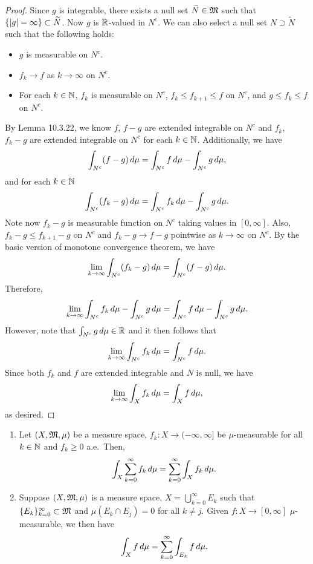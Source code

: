 \documentclass[a4paper]{article}
\renewcommand{\cupinfk}{\bigcup_{k=0}^\infty}
\renewcommand{\suminfk}{\sum_{k=0}^\infty}
\renewcommand{\seqinfk}[1]{\{ #1 \}_{k=0}^\infty}
\begin{document}
\begin{proof}
  Since $g$ is integrable, there exists a null set $\widetilde{N} \in \mathfrak{M}$
  such that $\left\{ \left\lvert g\right\rvert = \infty \right\} \subset \widetilde{N}$. Now $g$
  is $\mathbb{R}$-valued in $N^c$. We can also select a null set $N \supset
    \tilde{N}$ such that the following holds:
  \begin{itemize}
    \item $g$ is measurable on $N^c$.
    \item $f_k \to f$ as $k \to \infty$ on $N^c$.
    \item For each $k \in \mathbb{N}$, $f_k$ is measurable on $N^c$, $f_k \leq
          f_{k+1} \leq f$ on $N^c$, and $g \leq f_k \leq f$ on $N^c$.
  \end{itemize}
  By Lemma 10.3.22, we know $f$, $f - g$ are extended
  integrable on $N^c$ and $f_k$, $f_k - g$ are extended integrable
  on $N^c$ for each $k \in \mathbb{N}$. Additionally, we have
  \[
    \int_{N^c} (f - g) \, d \mu = \int_{N^c} f \, d \mu - \int_{N^c}
    g \, d \mu,
  \]
  and for each $k \in \mathbb{N}$
  \[
    \int_{N^c} (f_k - g) \, d \mu = \int_{N^c} f_k \, d \mu
    - \int_{N^c} g \, d \mu.
  \]
  Note now $f_k - g$ is measurable function on $N^c$ taking values in $[0,
  \infty]$. Also, $f_k - g \leq f_{k+1} - g$ on $N^c$ and $f_k - g \to f -
  g$ pointwise as $k \to \infty$ on $N^c$. By the basic version of
  monotone convergence theorem, we have
  \[
    \lim_{k \to \infty} \int_{N^c} (f_k - g) \, d \mu
    = \int_{N^c} (f - g) \, d \mu.
  \]
  Therefore,
  \[
    \lim_{k \to \infty} \int_{N^c} f_k \, d \mu
    - \int_{N^c} g \, d \mu = \int_{N^c} f \, d \mu
    - \int_{N^c} g \, d \mu.
  \]
  However, note that $\int_{N^c} g \, d \mu \in \mathbb{R}$ and it then follows that
  \[
    \lim_{k \to \infty} \int_{N^c} f_k \, d \mu =
    \int_{N^c} f \, d \mu.
  \]
  Since both $f_k$ and $f$ are extended integrable and $N$ is null, we
  have
  \[
    \lim_{k \to \infty} \int_X f_k \, d \mu = \int_X f \, d \mu,
  \]
  as desired.

\end{proof}

\begin{cor}
  \begin{enumerate}
    \item Let $(X, \mathfrak{M}, \mu)$ be a measure space, $f_k : X \to (-\infty,
          \infty]$ be $\mu$-measurable for all $k \in \mathbb{N}$ and $f_k \geq 0$
          a.e.\ Then,
          \[
            \int_X \suminfk f_k \d \mu = \suminfk \int_X f_k \d \mu.
          \]

    \item Suppose $(X, \mathfrak{M}, \mu)$ is a measure space, $X = \cupinfk E_k$
          such that $\seqinfk{E_k} \subset \mf$ and $\mu \left( E_k \cap
          E_j \right) = 0$ for all $k \neq j$. Given $f: X \to [0,
          \infty]$ $\mu$-measurable, we then have
          \[
            \int_X f \d \mu = \suminfk \int_{E_k} f \d \mu.
          \]
  \end{enumerate}
\end{cor}
\end{document}
